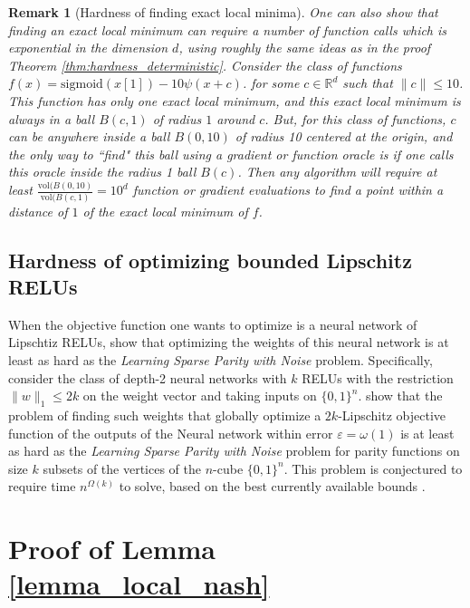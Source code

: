 \documentclass[11pt,letterpaper]{article}
\renewcommand{\epsilon}{\varepsilon}
\newtheorem{remark}[theorem]{Remark}
\begin{document}
\begin{remark} [Hardness of finding exact local minima] \label{local_minimum_hardness}
One can also show that finding an exact local minimum can require a number of function calls which is exponential in the dimension $d$, using roughly the same ideas as in the proof  Theorem \ref{thm:hardness_deterministic}.  Consider the class of functions $f(x) = \mathrm{sigmoid}(x[1]) - 10\psi(x + c)$. for some $c \in \mathbb{R}^d$ such that $\|c\| \leq 10$.  This function has only one exact local minimum, and this exact local minimum is always in a ball $B(c,1)$ of radius $1$ around $c$.  But, for this class of functions, $c$ can be anywhere inside a ball $B(0,10)$ of radius 10 centered at the origin, and the only way to ``find" this ball using a gradient or function oracle is if one calls this oracle inside the radius 1 ball $B(c)$.  Then any algorithm will require at least $\frac{\mathrm{vol}(B(0,10)}{\mathrm{vol}(B(c,1)} = 10^d$ function or gradient evaluations to find a point within a distance of $1$ of the exact local minimum of $f$. 
\end{remark}


\subsection{Hardness of optimizing bounded Lipschitz RELUs}

When the objective function one wants to optimize is a neural network of Lipschtiz RELUs, \cite{goel2017reliably} show that optimizing the weights of this neural network is at least as hard as the {\em Learning Sparse Parity with Noise} problem. 
%
 Specifically, consider the class of depth-2 neural networks with $k$ RELUs with the restriction $\|w\|_1 \leq 2k$ on the weight vector and taking inputs on $\{0,1\}^n$. \cite{goel2017reliably}  show that the problem of finding such weights that globally optimize a $2k$-Lipschitz objective function of the outputs of the Neural network within error $\epsilon = \omega(1)$ is at least as hard as the {\em Learning Sparse Parity with Noise} problem for parity functions on size $k$ subsets of the vertices of the $n$-cube $\{0,1\}^n$. 
  This problem is conjectured \cite{goel2017reliably} to require time $n^{\Omega(k)}$ to solve, based on the best currently available bounds \cite{blum2003noise, valiant2012finding}. 




\section{Proof of Lemma \ref{lemma_local_nash} } \label{Sec_Auxilliary}
\end{document}
